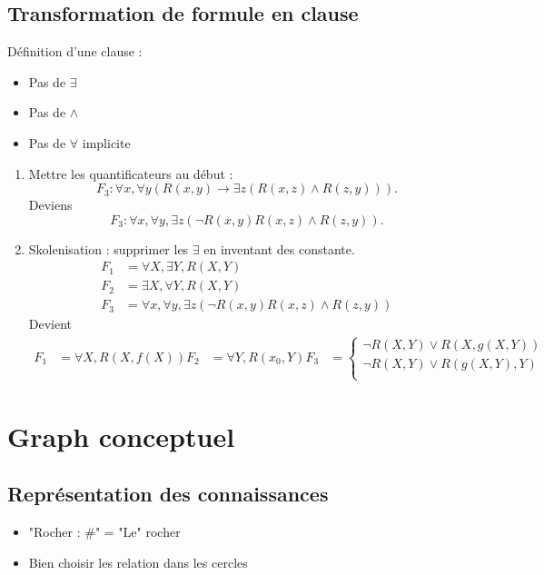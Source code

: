 \documentclass{article}
\theoremstyle{plain}%
\theoremstyle{definition}
\theoremstyle{remark}
\begin{document}
\subsection{Transformation de formule en clause}
Définition d'une clause : 
\begin{itemize}
    \item Pas de $ \exists  $ 
    \item Pas de $ \wedge  $ 
    \item Pas de $ \forall  $ implicite
\end{itemize}
\begin{enumerate}
    \item Mettre les quantificateurs au début : 
    \[
        F_3 : \forall x, \forall y (R(x,y) \to \exists z (R(x,z) \wedge R(z,y)))
    .\]
    Deviens 
    \[
        F_3 : \forall x, \forall y, \exists z (\neg R(x,y) R(x,z) \wedge R(z,y))
    .\]
    \item Skolenisation : supprimer les $ \exists  $ en inventant des constante. \begin{align*}
        F_1 &= \forall X, \exists Y, R(X,Y) \\
        F_2 &= \exists X, \forall Y, R(X,Y) \\
        F_3 &= \forall x, \forall y, \exists z (\neg R(x,y) R(x,z) \wedge R(z,y))
    \end{align*}
    Devient \begin{align*}
        F_1 &= \forall X, R(X, f(X))
        F_2 &= \forall Y, R(x_0, Y)
        F_3 &= \begin{cases}
        \neg R(X,Y) \vee R(X, g(X,Y)) \\
        \neg R(X,Y) \vee R(g(X,Y), Y) \\
        \end{cases} 
    \end{align*}
\end{enumerate}

\section{Graph conceptuel}
\subsection{Représentation des connaissances}
\begin{itemize}
    \item "Rocher : \#" = "Le" rocher
    \item Bien choisir les relation dans les cercles
\end{itemize}
\end{document}

